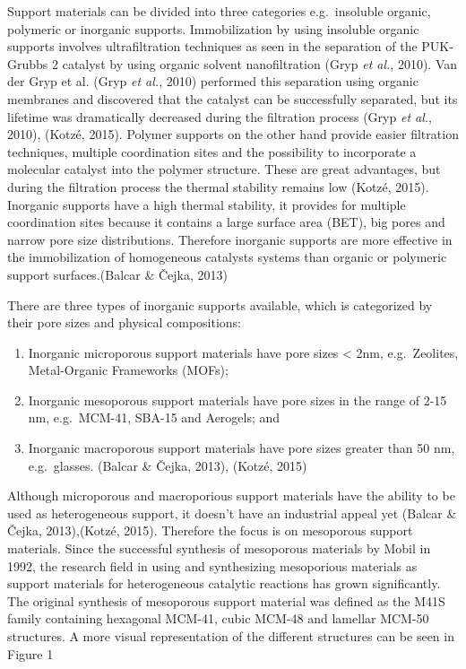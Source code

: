 \documentclass[]{article}
\providecommand{\tightlist}{%
  \setlength{\itemsep}{0pt}\setlength{\parskip}{0pt}}
\begin{document}
Support materials can be divided into three categories e.g.~insoluble
organic, polymeric or inorganic supports. Immobilization by using
insoluble organic supports involves ultrafiltration techniques as seen
in the separation of the PUK-Grubbs 2 catalyst by using organic solvent
nanofiltration (Gryp \emph{et al.}, 2010). Van der Gryp et al. (Gryp
\emph{et al.}, 2010) performed this separation using organic membranes
and discovered that the catalyst can be successfully separated, but its
lifetime was dramatically decreased during the filtration process (Gryp
\emph{et al.}, 2010), (Kotzé, 2015). Polymer supports on the other hand
provide easier filtration techniques, multiple coordination sites and
the possibility to incorporate a molecular catalyst into the polymer
structure. These are great advantages, but during the filtration process
the thermal stability remains low (Kotzé, 2015). Inorganic supports have
a high thermal stability, it provides for multiple coordination sites
because it contains a large surface area (BET), big pores and narrow
pore size distributions. Therefore inorganic supports are more effective
in the immobilization of homogeneous catalysts systems than organic or
polymeric support surfaces.(Balcar \& Čejka, 2013)

There are three types of inorganic supports available, which is
categorized by their pore sizes and physical compositions:

\begin{enumerate}
\def\labelenumi{\arabic{enumi}.}
\tightlist
\item
  Inorganic microporous support materials have pore sizes \textless{}
  2nm, e.g.~Zeolites, Metal-Organic Frameworks (MOFs);
\item
  Inorganic mesoporous support materials have pore sizes in the range of
  2-15 nm, e.g.~MCM-41, SBA-15 and Aerogels; and
\item
  Inorganic macroporous support materials have pore sizes greater than
  50 nm, e.g.~glasses. (Balcar \& Čejka, 2013), (Kotzé, 2015)
\end{enumerate}

Although microporous and macroporious support materials have the ability
to be used as heterogeneous support, it doesn't have an industrial
appeal yet (Balcar \& Čejka, 2013),(Kotzé, 2015). Therefore the focus is
on mesoporous support materials. Since the successful synthesis of
mesoporous materials by Mobil in 1992, the research field in using and
synthesizing mesoporious materials as support materials for
heterogeneous catalytic reactions has grown significantly. The original
synthesis of mesoporous support material was defined as the M41S family
containing hexagonal MCM-41, cubic MCM-48 and lamellar MCM-50
structures. A more visual representation of the different structures can
be seen in Figure 1
\end{document}
